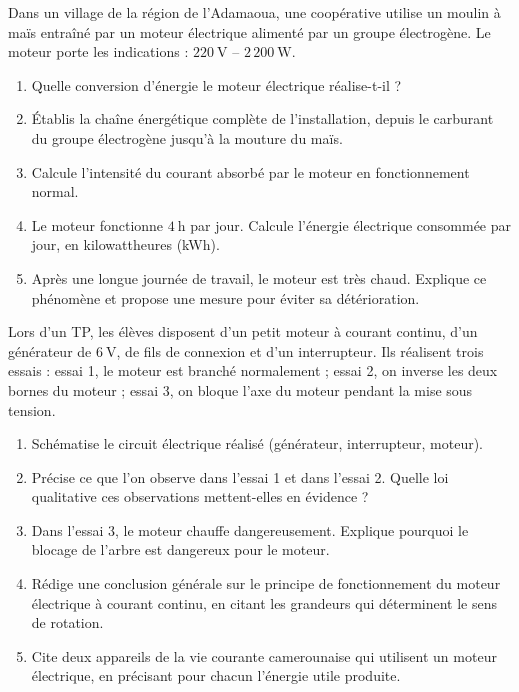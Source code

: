\documentclass[11pt]{article}
\begin{document}
\begin{exercice}
Dans un village de la région de l'Adamaoua, une coopérative utilise un moulin à maïs entraîné par un moteur électrique alimenté par un groupe électrogène. Le moteur porte les indications : $220~\text{V}$ -- $2\,200~\text{W}$.
\begin{enumerate}
\item Quelle conversion d'énergie le moteur électrique réalise-t-il ?
\item Établis la chaîne énergétique complète de l'installation, depuis le carburant du groupe électrogène jusqu'à la mouture du maïs.
\item Calcule l'intensité du courant absorbé par le moteur en fonctionnement normal.
\item Le moteur fonctionne $4~\text{h}$ par jour. Calcule l'énergie électrique consommée par jour, en kilowattheures (\si{kWh}).
\item Après une longue journée de travail, le moteur est très chaud. Explique ce phénomène et propose une mesure pour éviter sa détérioration.
\end{enumerate}
\end{exercice}

\begin{exercice}
Lors d'un TP, les élèves disposent d'un petit moteur à courant continu, d'un générateur de $6~\text{V}$, de fils de connexion et d'un interrupteur. Ils réalisent trois essais : essai 1, le moteur est branché normalement ; essai 2, on inverse les deux bornes du moteur ; essai 3, on bloque l'axe du moteur pendant la mise sous tension.
\begin{enumerate}
\item Schématise le circuit électrique réalisé (générateur, interrupteur, moteur).
\item Précise ce que l'on observe dans l'essai 1 et dans l'essai 2. Quelle loi qualitative ces observations mettent-elles en évidence ?
\item Dans l'essai 3, le moteur chauffe dangereusement. Explique pourquoi le blocage de l'arbre est dangereux pour le moteur.
\item Rédige une conclusion générale sur le principe de fonctionnement du moteur électrique à courant continu, en citant les grandeurs qui déterminent le sens de rotation.
\item Cite deux appareils de la vie courante camerounaise qui utilisent un moteur électrique, en précisant pour chacun l'énergie utile produite.
\end{enumerate}
\end{exercice}
\end{document}
